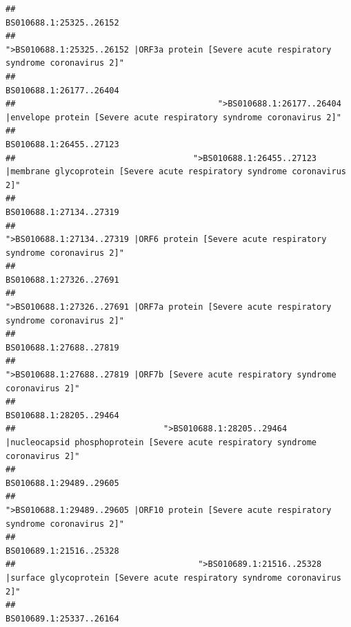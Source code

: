 \documentclass[
]{article}
\begin{document}
\begin{verbatim}
##                                                                                                                BS010688.1:25325..26152 
##                                            ">BS010688.1:25325..26152 |ORF3a protein [Severe acute respiratory syndrome coronavirus 2]" 
##                                                                                                                BS010688.1:26177..26404 
##                                         ">BS010688.1:26177..26404 |envelope protein [Severe acute respiratory syndrome coronavirus 2]" 
##                                                                                                                BS010688.1:26455..27123 
##                                    ">BS010688.1:26455..27123 |membrane glycoprotein [Severe acute respiratory syndrome coronavirus 2]" 
##                                                                                                                BS010688.1:27134..27319 
##                                             ">BS010688.1:27134..27319 |ORF6 protein [Severe acute respiratory syndrome coronavirus 2]" 
##                                                                                                                BS010688.1:27326..27691 
##                                            ">BS010688.1:27326..27691 |ORF7a protein [Severe acute respiratory syndrome coronavirus 2]" 
##                                                                                                                BS010688.1:27688..27819 
##                                                    ">BS010688.1:27688..27819 |ORF7b [Severe acute respiratory syndrome coronavirus 2]" 
##                                                                                                                BS010688.1:28205..29464 
##                              ">BS010688.1:28205..29464 |nucleocapsid phosphoprotein [Severe acute respiratory syndrome coronavirus 2]" 
##                                                                                                                BS010688.1:29489..29605 
##                                            ">BS010688.1:29489..29605 |ORF10 protein [Severe acute respiratory syndrome coronavirus 2]" 
##                                                                                                                BS010689.1:21516..25328 
##                                     ">BS010689.1:21516..25328 |surface glycoprotein [Severe acute respiratory syndrome coronavirus 2]" 
##                                                                                                                BS010689.1:25337..26164 

\end{verbatim}
\end{document}
